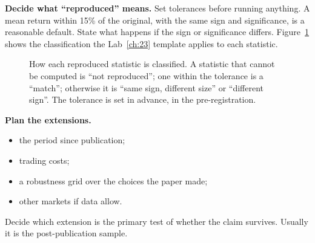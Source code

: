 \textbf{Decide what ``reproduced'' means.} Set tolerances before running anything. A mean return within 15\% of the original, with the same sign and significance, is a reasonable default. State what happens if the sign or significance differs. Figure~\ref{fig:24-status} shows the classification the Lab~\ref{ch:23} template applies to each statistic.

\begin{figure}[htbp]
\centering
{}
\caption{How each reproduced statistic is classified. A statistic that cannot be computed is ``not reproduced''; one within the tolerance is a ``match''; otherwise it is ``same sign, different size'' or ``different sign''. The tolerance is set in advance, in the pre-registration.}
\label{fig:24-status}
\end{figure}

\textbf{Plan the extensions.}

\begin{itemize}
  \item the period since publication;
  \item trading costs;
  \item a robustness grid over the choices the paper made;
  \item other markets if data allow.
\end{itemize}

Decide which extension is the primary test of whether the claim survives. Usually it is the post-publication sample.

